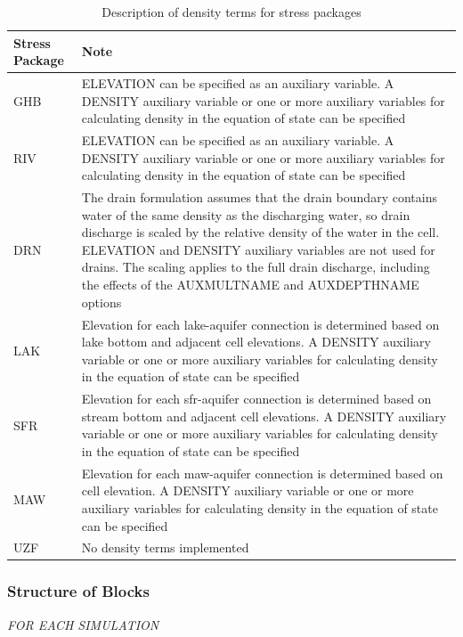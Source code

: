 \begin{longtable}{p{3cm} p{12cm}}
\caption{Description of density terms for stress packages}
\tabularnewline
\hline
\hline
\textbf{Stress Package} & \textbf{Note} \\
\hline
\endhead
\hline
\endfoot
GHB & ELEVATION can be specified as an auxiliary variable.  A DENSITY auxiliary variable or one or more auxiliary variables for calculating density in the equation of state can be specified \\
RIV & ELEVATION can be specified as an auxiliary variable.  A DENSITY auxiliary variable or one or more auxiliary variables for calculating density in the equation of state can be specified \\
DRN & The drain formulation assumes that the drain boundary contains water of the same density as the discharging water, so drain discharge is scaled by the relative density of the water in the cell.  ELEVATION and DENSITY auxiliary variables are not used for drains.  The scaling applies to the full drain discharge, including the effects of the AUXMULTNAME and AUXDEPTHNAME options \\
LAK & Elevation for each lake-aquifer connection is determined based on lake bottom and adjacent cell elevations. A DENSITY auxiliary variable or one or more auxiliary variables for calculating density in the equation of state can be specified \\
SFR & Elevation for each sfr-aquifer connection is determined based on stream bottom and adjacent cell elevations. A DENSITY auxiliary variable or one or more auxiliary variables for calculating density in the equation of state can be specified \\
MAW & Elevation for each maw-aquifer connection is determined based on cell elevation. A DENSITY auxiliary variable or one or more auxiliary variables for calculating density in the equation of state can be specified \\
UZF & No density terms implemented \\
\end{longtable}

\vspace{5mm}
\subsubsection{Structure of Blocks}

\vspace{5mm}
\noindent \textit{FOR EACH SIMULATION}



%

